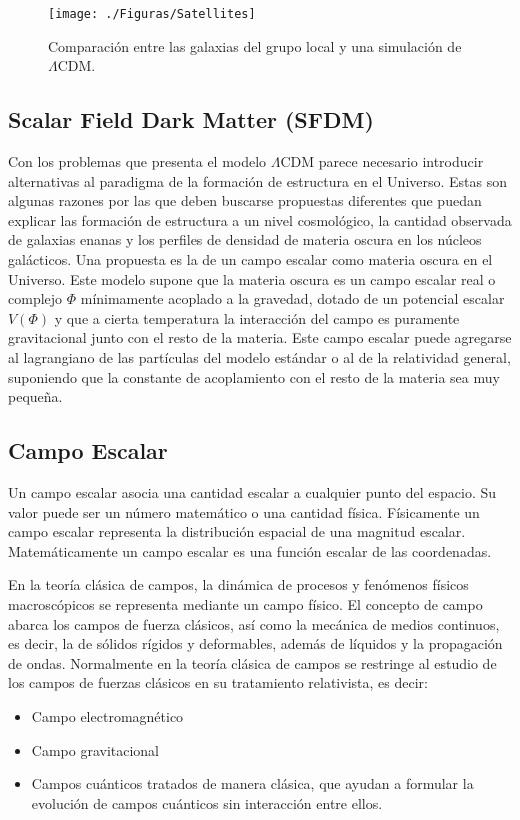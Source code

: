 \documentclass[a4paper,openright,12pt]{book}
\begin{document}
\begin{figure}
\centering
 \texttt{[image: ./Figuras/Satellites]}
 \caption{\footnotesize{Comparación entre las galaxias del grupo local y una simulación de $\Lambda$CDM.}}
\end{figure}





\subsection{Scalar Field Dark Matter (SFDM)}
Con los problemas que presenta el modelo $\Lambda$CDM parece necesario introducir alternativas al paradigma de la formación de estructura en el Universo. Estas son algunas razones por las que deben buscarse propuestas diferentes que puedan explicar las formación de estructura a un nivel cosmológico, la cantidad observada de galaxias enanas y los perfiles de densidad de materia oscura en los núcleos galácticos.
Una propuesta es la de un campo escalar como materia oscura en el Universo. Este modelo supone que la materia oscura es un campo escalar real o complejo $\Phi$ mínimamente acoplado a la gravedad, dotado de un potencial escalar $V(\Phi)$ y que a cierta temperatura la interacción  del campo es puramente gravitacional junto con el resto de la materia. Este campo escalar puede agregarse al lagrangiano de las partículas del modelo estándar o al de la relatividad general, suponiendo que la constante de acoplamiento con el resto de la materia sea muy pequeña.

\subsection*{Campo Escalar}
Un campo escalar asocia una cantidad escalar a cualquier punto del espacio. Su valor puede ser un número matemático o una cantidad física. Físicamente un campo escalar representa la distribución espacial de una magnitud escalar. Matemáticamente un campo escalar es una función escalar de las coordenadas.

En la teoría clásica de campos, la dinámica de procesos y fenómenos físicos macroscópicos se representa mediante un campo físico. El concepto de campo abarca los campos de fuerza clásicos, así como la mecánica de medios continuos, es decir, la de sólidos rígidos y deformables, además de líquidos y la propagación de ondas. Normalmente en la teoría clásica de campos se restringe al estudio de los campos de fuerzas clásicos en su tratamiento relativista, es decir: 
\begin{itemize}
\item Campo electromagnético
\item Campo gravitacional
\item Campos cuánticos tratados de manera clásica, que ayudan a formular la evolución de campos cuánticos sin interacción entre ellos.
\end{itemize}
\end{document}
